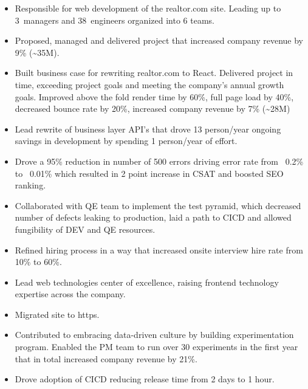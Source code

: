 \documentclass[11pt,a4paper,roman]{moderncv}       %
\begin{document}
\begin{itemize}
    \item Responsible for web development of the realtor.com site. Leading up to 3~managers and 38~engineers organized into 6 teams.  
    \item Proposed, managed and delivered project that increased company revenue by 9\% (\textasciitilde35M).
    \item Built business case for rewriting realtor.com to React. Delivered project in time, exceeding project goals and meeting the company's annual growth goals. Improved above the fold render time by 60\%, full page load by 40\%, decreased bounce rate by 20\%, increased company revenue by 7\% (\textasciitilde28M)
    \item Lead rewrite of business layer API's that drove 13 person/year ongoing savings in development by spending 1 person/year of effort.
    \item Drove a 95\% reduction in number of 500 errors driving error rate from ~0.2\% to ~0.01\% which resulted in 2 point increase in CSAT and boosted SEO ranking.
    \item Collaborated with QE team to implement the test pyramid, which decreased number of defects leaking to production, laid a path to CICD and allowed fungibility of DEV and QE resources.
    \item Refined hiring process in a way that increased onsite interview hire rate from 10\% to 60\%.
    \item Lead web technologies center of excellence, raising frontend technology expertise across the company.
    \item Migrated site to https.
    \item Contributed to embracing data-driven culture by building experimentation program. Enabled the PM team to run over 30 experiments in the first year that in total increased company revenue by 21\%.
    \item Drove adoption of CICD reducing release time from 2 days to 1 hour.



\end{itemize}
\end{document}
